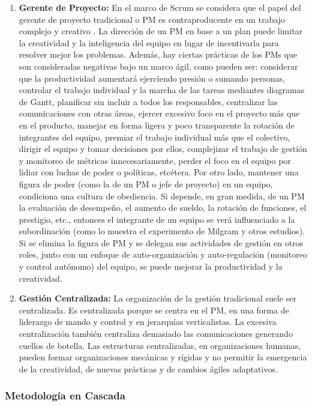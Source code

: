 \begin{enumerate}
\item \textbf{Gerente de Proyecto:} En el marco de Scrum se considera que el papel del gerente de proyecto tradicional o PM es contraproducente en un trabajo complejo y creativo \cite{Ken-Schwaber-2011}. La dirección de un PM en base a un plan puede limitar la creatividad y la inteligencia del equipo en lugar de incentivarla para resolver mejor los problemas. Además, hay ciertas prácticas de los PMs que son consideradas negativas bajo un marco ágil, como pueden ser: considerar que la productividad aumentará ejerciendo presión o sumando personas, controlar el trabajo individual y la marcha de las tareas mediantes diagramas de Gantt, planificar sin incluir a todos los responsables, centralizar las comunicaciones con otras áreas, ejercer excesivo foco en el proyecto más que en el producto, manejar en forma ligera y poco transparente la rotación de integrantes del equipo, premiar el trabajo individual más que el colectivo, dirigir el equipo y tomar decisiones por ellos, complejizar el trabajo de gestión y monitoreo de métricas innecesariamente, perder el foco en el equipo por lidiar con luchas de poder o políticas, etcétera. Por otro lado, mantener una figura de poder (como la de un PM o jefe de proyecto) en un equipo, condiciona una cultura de obediencia. Si depende, en gran medida, de un PM la evaluación de desempeño, el aumento de sueldo, la rotación de funciones, el prestigio, etc., entonces el integrante de un equipo se verá influenciado a la subordinación (como lo muestra el experimento de Milgram y otros estudios). Si se elimina la figura de PM y se delegan sus actividades de gestión en otros roles, junto con un enfoque de auto-organización y auto-regulación (monitoreo y control autónomo) del equipo, se puede mejorar la productividad y la creatividad.

\item \textbf{Gestión Centralizada:} La organización de la gestión tradicional suele ser centralizada. Es centralizada porque se centra en el PM, en una forma de liderazgo de mando y control y en jerarquías verticalistas. La excesiva centralización también centraliza demasiado las comunicaciones generando cuellos de botella. Las estructuras centralizadas, en organizaciones humanas, pueden formar organizaciones mecánicas y rígidas y no permitir la emergencia de la creatividad, de nuevas prácticas y de cambios ágiles adaptativos.

\end{enumerate}


\subsubsection{Metodología en Cascada}

